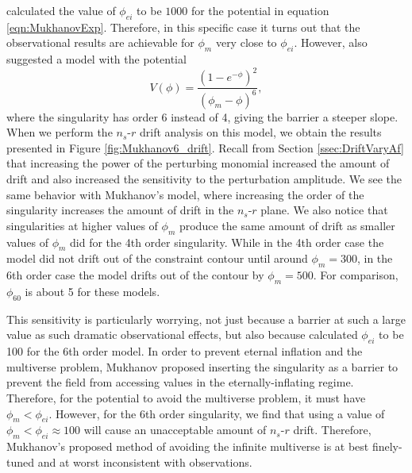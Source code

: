 \documentclass[a4paper,11pt]{article}
\def\nsr{$n_s$-$r$ }
\begin{document}
\citet{Mukhanov2014} calculated the value of $\phi_{ei}$ to be $1000$ for the potential in equation \ref{eqn:MukhanovExp}. Therefore, in this specific case it turns out that the observational results are achievable for $\phi_m$ very close to $\phi_{ei}$. However, \citet{Mukhanov2014} also suggested a model with the potential
\begin{equation}
V(\phi)=\frac{(1-e^{-\phi})^2}{(\phi_m-\phi)^6},
\label{eqn:MukhanovExp6}
\end{equation}
where the singularity has order 6 instead of 4, giving the barrier a steeper slope. When we perform the \nsr drift analysis on this model, we obtain the results presented in Figure \ref{fig:Mukhanov6_drift}. Recall from Section \ref{ssec:DriftVaryAf} that increasing the power of the perturbing monomial increased the amount of drift and also increased the sensitivity to the perturbation amplitude. We see the same behavior with Mukhanov's model, where increasing the order of the singularity increases the amount of drift in the \nsr plane. We also notice that singularities at higher values of $\phi_m$ produce the same amount of drift as smaller values of $\phi_m$ did for the 4th order singularity. While in the 4th order case the model did not drift out of the \citet{Planck2015} constraint contour until around $\phi_m=300$, in the 6th order case the model drifts out of the contour by $\phi_m=500$. For comparison, $\phi_{60}$ is about 5 for these models. 

This sensitivity is particularly worrying, not just because a barrier at such a large value as such dramatic observational effects, but also because \citet{Mukhanov2014} calculated $\phi_{ei}$ to be 100 for the 6th order model. In order to prevent eternal inflation and the multiverse problem, Mukhanov proposed inserting the singularity as a barrier to prevent the field from accessing values in the eternally-inflating regime. Therefore, for the potential to avoid the multiverse problem, it must have $\phi_m<\phi_{ei}$. However, for the 6th order singularity, we find that using a value of $\phi_m<\phi_{ei}\approx100$ will cause an unacceptable amount of \nsr drift. Therefore, Mukhanov's proposed method of avoiding the infinite multiverse is at best finely-tuned and at worst inconsistent with observations. 
\end{document}
